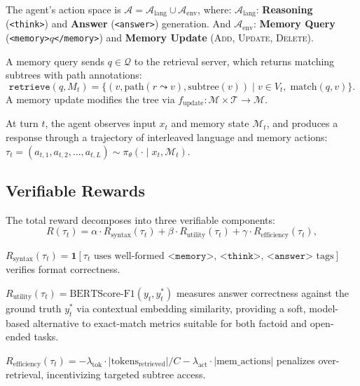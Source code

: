 \documentclass{article}
\theoremstyle{definition}
\begin{document}
The agent's action space is $\mathcal{A} = \mathcal{A}_{\text{lang}} \cup \mathcal{A}_{\text{env}}$, where:
$\mathcal{A}_{\text{lang}}$: \textbf{Reasoning} (\texttt{<think>}) and \textbf{Answer} (\texttt{<answer>}) generation.
And $\mathcal{A}_{\text{env}}$: \textbf{Memory Query} (\texttt{<memory>}$q$\texttt{</memory>}) and \textbf{Memory Update} (\textsc{Add}, \textsc{Update}, \textsc{Delete}).

A memory query sends $q \in \mathcal{Q}$ to the retrieval server, which returns matching subtrees with path annotations:
\begin{equation}
\texttt{retrieve}(q, M_t) = \bigl\{(v, \text{path}(r \leadsto v), \text{subtree}(v)) \;\big|\; v \in V_t,\; \text{match}(q, v)\bigr\}.
\end{equation}
A memory update modifies the tree via $f_{\text{update}}: \mathcal{M} \times \mathcal{T} \to \mathcal{M}$.

At turn $t$, the agent observes input $x_t$ and memory state $\mathcal{M}_t$, and produces a response through a trajectory of interleaved language and memory actions:
$
\tau_t = (a_{t,1}, a_{t,2}, \ldots, a_{t,L}) \sim \pi_\theta(\cdot \mid x_t, \mathcal{M}_t).
$

\subsection{Verifiable Rewards}

The total reward decomposes into three verifiable components:
\begin{equation}
R(\tau_t) = \alpha \cdot R_{\text{syntax}}(\tau_t) + \beta \cdot R_{\text{utility}}(\tau_t) + \gamma \cdot R_{\text{efficiency}}(\tau_t),
\end{equation}


$R_{\text{syntax}}(\tau_t) = \mathbf{1}[\tau_t \text{ uses well-formed } \texttt{<memory>}\text{, } \texttt{<think>}\text{, } \texttt{<answer>} \text{ tags}]$ verifies format correctness.

$R_{\text{utility}}(\tau_t) = \text{BERTScore-F1}(y_t, y_t^*)$ measures answer 
correctness against the ground truth $y_t^*$ via contextual embedding similarity, 
providing a soft, model-based alternative to exact-match metrics suitable for both 
factoid and open-ended tasks.

$R_{\text{efficiency}}(\tau_t) = -\lambda_{\text{tok}} \cdot |\text{tokens}_{\text{retrieved}}| / C - \lambda_{\text{act}} \cdot |\text{mem\_actions}|$ penalizes over-retrieval, incentivizing targeted subtree access.
\end{document}
